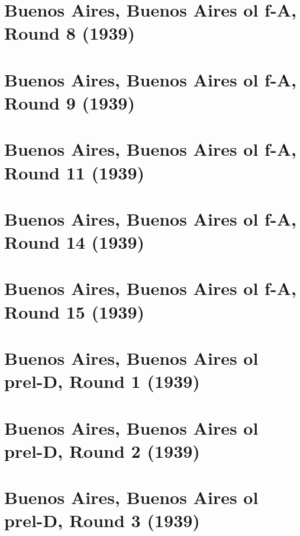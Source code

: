 \documentclass[11pt]{article}
\begin{document}
\clearpage

\section{Buenos Aires, Buenos Aires ol f-A, Round 8 (1939)}


\clearpage

\section{Buenos Aires, Buenos Aires ol f-A, Round 9 (1939)}


\clearpage

\section{Buenos Aires, Buenos Aires ol f-A, Round 11 (1939)}


\clearpage

\section{Buenos Aires, Buenos Aires ol f-A, Round 14 (1939)}


\clearpage

\section{Buenos Aires, Buenos Aires ol f-A, Round 15 (1939)}


\clearpage

\section{Buenos Aires, Buenos Aires ol prel-D, Round 1 (1939)}


\clearpage

\section{Buenos Aires, Buenos Aires ol prel-D, Round 2 (1939)}


\clearpage

\section{Buenos Aires, Buenos Aires ol prel-D, Round 3 (1939)}

\end{document}
